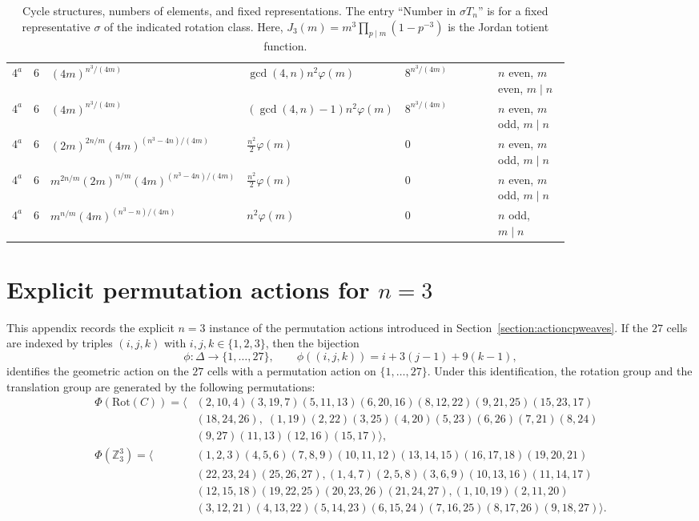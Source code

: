 \documentclass[12pt]{article}
\theoremstyle{definition}
\theoremstyle{remark}
\begin{document}
\begin{table}
\begin{tabular}{c c p{0.29\linewidth} p{0.20\linewidth} p{0.18\linewidth} p{0.14\linewidth}}
\midrule

$4^a$
& $6$
& $(4m)^{n^3/(4m)}$
& $\gcd(4,n)n^2\varphi(m)$
& $8^{n^3/(4m)}$
& $n$ even, $m$ even, $m\mid n$ \\

$4^a$
& $6$
& $(4m)^{n^3/(4m)}$
& $(\gcd(4,n)-1)n^2\varphi(m)$
& $8^{n^3/(4m)}$
& $n$ even, $m$ odd, $m\mid n$ \\

$4^a$
& $6$
& $(2m)^{2n/m}(4m)^{(n^3-4n)/(4m)}$
& $\frac{n^2}{2}\varphi(m)$
& $0$
& $n$ even, $m$ odd, $m\mid n$ \\

$4^a$
& $6$
& $m^{2n/m}(2m)^{n/m}(4m)^{(n^3-4n)/(4m)}$
& $\frac{n^2}{2}\varphi(m)$
& $0$
& $n$ even, $m$ odd, $m\mid n$ \\

$4^a$
& $6$
& $m^{n/m}(4m)^{(n^3-n)/(4m)}$
& $n^2\varphi(m)$
& $0$
& $n$ odd, $m\mid n$ \\

\bottomrule
\end{tabular}
\caption{Cycle structures, numbers of elements, and fixed representations. The entry ``Number in $\sigma T_n$'' is for a fixed representative $\sigma$ of the indicated rotation class. Here, $J_3(m)=m^3\prod_{p\mid m}(1-p^{-3})$ is the Jordan totient function.}
\label{tab:cycle-summary}
\end{table}



\clearpage

\appendix
\section{Explicit permutation actions for $n=3$}
\label{app:n3-permutation-actions}

This appendix records the explicit $n=3$ instance of the permutation actions introduced in Section~\ref{section:actioncpweaves}. If the $27$ cells are indexed by triples $(i,j,k)$ with $i,j,k\in\{1,2,3\}$, then the bijection
\[
\phi:\Delta\to \{1,\ldots,27\},\qquad
\phi((i,j,k))=i+3(j-1)+9(k-1),
\]
identifies the geometric action on the $27$ cells with a permutation action on $\{1,\ldots,27\}$. Under this identification, the rotation group and the translation group are generated by the following permutations:
\begin{align*}
\Phi(\mathrm{Rot}(C))=\langle &    (2,10,4)(3,19,7)(5,11,13)(6,20,16)(8,12,22)(9,21,25)(15,23,17)\\&(18,24,26),\; (1,19)(2,22)(3,25)(4,20)(5,23)(6,26)(7,21)(8,24)\\&(9,
    27)(11,13)(12,16)(15,17)\rangle,\\
\Phi(\mathbb{Z}^3_3)=\langle &(1,2,3)(4,5,6)(7,8,9)(10,11,12)(13,14,15)(16,17,18)(19,20,21)\\
&(22,23,24)(25,26,27),(1,4,7)(2,5,8)(3,6,9)(10,13,16)(11,14,
    17)\\
&(12,15,18)(19,22,25)(20,23,26)(21,24,27),(1,10,19)(2,11,20)\\
&(3,12,21)(4,13,22)(5,14,23)(6,15,24)(7,16,25)(8,17,26)(9,18,
    27)\rangle.
\end{align*}




\end{document}
